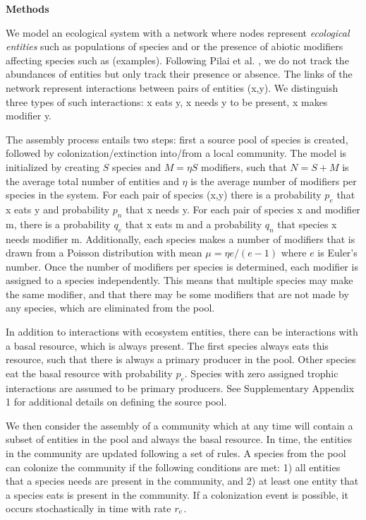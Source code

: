 \documentclass[twocolumn,preprintnumbers,amsmath,amssymb,superscriptaddress,linenumbers]{revtex4-1}
\newcommand{\rr}[1]{{\rm #1}}
\begin{document}
\vspace{-2mm}
\noindent \textbf{Methods}\\
  \footnotesize{
  We model an ecological system with a network where nodes represent \emph{ecological entities} such as populations of species and or the presence of abiotic modifiers affecting species such as (examples).
  Following Pilai et al. \cite{Pillai2011}, we do not track the abundances of entities but only track their presence or absence.
  The links of the network represent interactions between pairs of entities (x,y).
  We distinguish three types of such interactions: x eats y, x needs y to be present, x makes modifier y.

  The assembly process entails two steps: first a source pool of species is created, followed by colonization/extinction into/from a local community.
  The model is initialized by creating $S$ species and $M = \eta S$ modifiers, such that $N=S+M$ is the average total number of entities and $\eta$ is the average number of modifiers per species in the system.
  For each pair of species (x,y) there is a probability $p_e$ that x eats y and probability $p_n$ that x needs y.
  For each pair of species x and modifier m, there is a probability $q_e$ that x eats m and a probability $q_n$ that species x needs modifier m.
  Additionally, each species makes a number of modifiers that is drawn from a Poisson distribution with mean $\mu = \eta e/(e-1)$ where $e$ is Euler's number.
  Once the number of modifiers per species is determined, each modifier is assigned to a species independently.
  This means that multiple species may make the same modifier, and that there may be some modifiers that are not made by any species, which are eliminated from the pool.

  In addition to interactions with ecosystem entities, there can be interactions with a basal resource, which is always present.
  The first species always eats this resource, such that there is always a primary producer in the pool.
  Other species eat the basal resource with probability $p_e$.
  Species with zero assigned trophic interactions are assumed to be primary producers.
  See Supplementary Appendix 1 for additional details on defining the source pool.

  We then consider the assembly of a community which at any time will contain a subset of entities in the pool and always the basal resource.
  In time, the entities in the community are updated following a set of rules.
  A species from the pool can colonize the community if the following conditions are met:
  1) all entities that a species needs are present in the community, and
  2) at least one entity that a species eats is present in the community.
  If a colonization event is possible, it occurs stochastically in time with rate $r_\rr{c}$.

}
\end{document}

